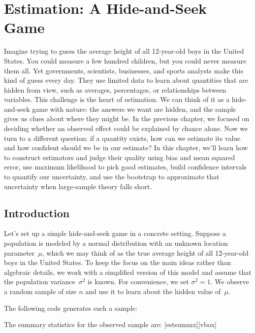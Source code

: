 \chapter{Estimation: A Hide-and-Seek Game}
\label{ch:estimation}

Imagine trying to guess the average height of all 12-year-old boys in the
United States. You could measure a few hundred children, but you could
never measure them all. Yet governments, scientists, businesses, and sports
analysts make this kind of guess every day. They use limited data to learn
about quantities that are hidden from view, such as averages, percentages,
or relationships between variables. This challenge is the heart of
estimation. We can think of it as a hide-and-seek game with nature: the
answers we want are hidden, and the sample gives us clues about where
they might be. In the previous chapter, we focused on deciding whether
an observed effect could be explained by chance alone. Now we turn to a
different question: if a quantity exists, how can we estimate its value
and how confident should we be in our estimate? In this chapter, we'll
learn how to construct estimators and judge their quality using bias
and mean squared error, use maximum likelihood to pick good estimates,
build confidence intervals to quantify our uncertainty, and use the
bootstrap to approximate that uncertainty when large-sample theory
falls short.


\section{Introduction}
\label{sec:intro}

Let's set up a simple hide-and-seek game in a concrete setting. Suppose a
population is modeled by a normal distribution with an unknown location
parameter~$\mu$, which we may think of as the true average height of all
12-year-old boys in the United States. To keep the focus on the main ideas
rather than algebraic details, we work with a simplified version of this
model and assume that the population variance~$\sigma^2$ is known. For
convenience, we set $\sigma^2 = 1$. We observe a random sample of size $n$
and use it to learn about the hidden value of~$\mu$.


The following code generates such a sample:



The summary statistics for the observed sample are:
[estsummx][vbox]



